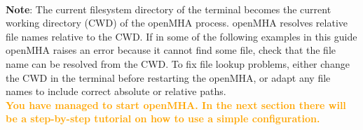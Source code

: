 \documentclass[11pt,a4paper,twoside]{article}
\newcommand{\+}{\discretionary{\mbox{\scriptsize$\hookleftarrow$}}{}{}}
\begin{document}
{{\dotfill \\

\large{\textbf{Note}}:
The current filesystem directory of the terminal becomes the
current working directory (CWD) of the openMHA process.
openMHA resolves relative file names relative to the CWD.
If in some of the following examples in this guide
openMHA raises an error because it cannot find some file,
check that the file name can be resolved from the CWD.
To fix file lookup problems, either change the CWD in the
terminal before restarting the openMHA, or adapt any file
names to include correct absolute or relative paths.
\\

\textcolor{orange}{\textbf{You have managed to start openMHA. In the next section there will be a step-by-step tutorial on how to use a simple configuration.}}

\vspace{1cm}





\newpage
}}
\end{document}
